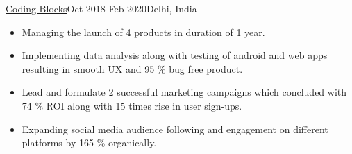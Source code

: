 \documentclass[10pt,a4paper,ragged2e]{altacv}
\begin{document}
 {\color{mecol}\href{https://codingblocks.com}{Coding Blocks}}{Oct 2018-Feb 2020}{Delhi, India}
\begin{itemize}
\item {Managing the launch of 4 products in duration of 1 year. }
\item {Implementing data analysis along with testing of android and web apps resulting in smooth UX and 95 \% bug free product.}
\item { Lead and formulate 2 successful marketing campaigns which concluded with 74 \% ROI along with 15 times rise in user sign-ups.}
\item {Expanding social media audience following and engagement on different platforms by 165 \% organically.}

\end{itemize}

    



    



\end{document}

